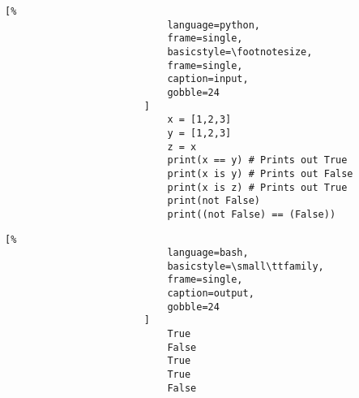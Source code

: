 \documentclass[crop=false,class=book,oneside]{standalone}
\begin{document}
                    \begin{minipage}[t]{.48\textwidth}
                        \centering
                        \begin{lstlisting}[%
                            language=python,
                            frame=single,
                            basicstyle=\footnotesize,
                            frame=single,
                            caption=input,
                            gobble=24
                        ]
                            x = [1,2,3]
                            y = [1,2,3]
                            z = x
                            print(x == y) # Prints out True
                            print(x is y) # Prints out False
                            print(x is z) # Prints out True
                            print(not False)
                            print((not False) == (False))
                        \end{lstlisting}
                    \end{minipage}\hfill
                    \begin{minipage}[t]{.48\textwidth}
                        \centering
                        \begin{lstlisting}[%
                            language=bash,
                            basicstyle=\small\ttfamily,
                            frame=single,
                            caption=output,
                            gobble=24
                        ]
                            True
                            False
                            True
                            True
                            False
                        \end{lstlisting}
                    \end{minipage}
\end{document}
